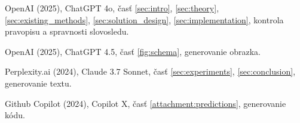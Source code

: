 \begin{trivlist}
\item OpenAI (2025), ChatGPT 4o, časť \ref{sec:intro}, \ref{sec:theory}, \ref{sec:existing_methods}, \ref{sec:solution_design}, \ref{sec:implementation}, kontrola pravopisu a spravnosti slovosledu.

\item OpenAI (2025), ChatGPT 4.5, časť \ref{fig:schema}, generovanie obrazka.
\item Perplexity.ai (2024), Claude 3.7 Sonnet, časť \ref{sec:experiments}, \ref{sec:conclusion}, generovanie textu.

\item Github Copilot (2024), Copilot X, časť \ref{attachment:predictions}, generovanie kódu.

\end{trivlist}
